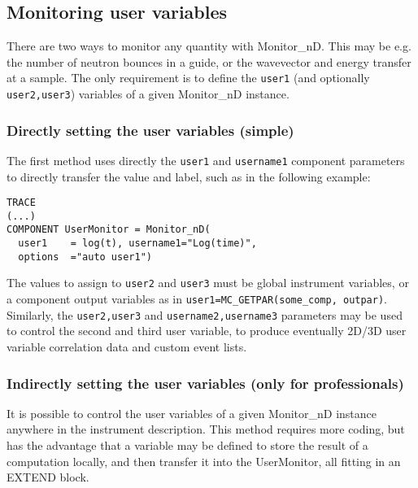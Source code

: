\subsection{Monitoring user variables}
\label{s:monnd:user}

There are two ways to monitor any quantity with Monitor\_nD. This may be e.g. the number of neutron bounces in a guide, or the wavevector and energy transfer at a sample. The only requirement is to define the \verb+user1+ (and optionally \verb+user2,user3+) variables of a given Monitor\_nD instance.

\subsubsection{Directly setting the user variables (simple)}

The first method uses directly the \verb+user1+ and \verb+username1+ component parameters to directly transfer the value and label, such as in the following example:
\begin{lstlisting}
TRACE
(...)
COMPONENT UserMonitor = Monitor_nD(
  user1    = log(t), username1="Log(time)",
  options  ="auto user1")
\end{lstlisting}
The values to assign to \verb+user2+ and \verb+user3+ must be global instrument variables, or a component output variables as in \verb+user1=MC_GETPAR(some_comp, outpar)+.
Similarly, the \verb+user2,user3+ and \verb+username2,username3+ parameters may be used to control the second and third user variable, to produce eventually 2D/3D user variable correlation data and custom event lists.

\subsubsection{Indirectly setting the user variables (only for professionals)}

It is possible to control the user variables of a given Monitor\_nD instance anywhere in the instrument description. This method requires more coding, but has the advantage that a variable may be defined to store the result of a computation locally, and then transfer it into the UserMonitor, all fitting in an EXTEND block.

